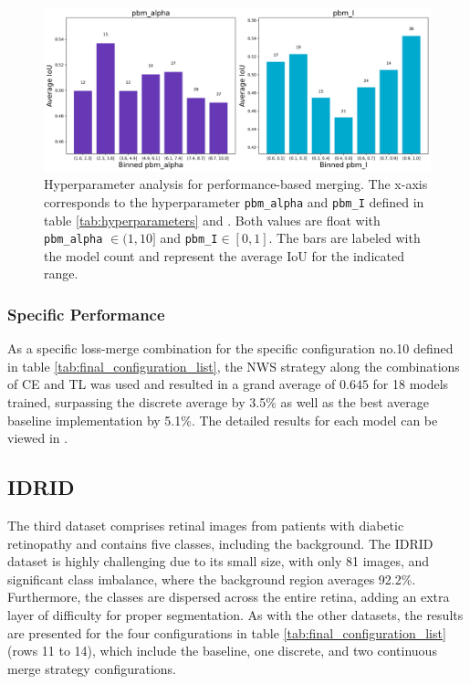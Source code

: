 \begin{figure}[H]%
  \centering
  \includegraphics[width=\imgWidthL]{images/continous_hyperparameter_total_melanoma.png}
  \caption[Hyperparameter analysis]{Hyperparameter analysis for performance-based merging. The x-axis corresponds to the hyperparameter \texttt{pbm\_alpha} and \texttt{pbm\_I} defined in table \ref{tab:hyperparameters} and . Both values are float with \texttt{pbm\_alpha} $\in (1,10]$ and \texttt{pbm\_I}$\in [0,1]$. The bars are labeled with the model count and represent the average \ac{IoU} for the indicated range.}
  \label{continous_results_total_melanoma}
\end{figure}

\subsubsection*{Specific Performance}
As a specific loss-merge combination for the specific configuration no.10 defined in table \ref{tab:final_configuration_list}, the NWS strategy along the combinations of \ac{CE} and \ac{TL} was used and resulted in a grand average of $0.645$ for 18 models trained, surpassing the discrete average by 3.5\% as well as the best average baseline implementation by 5.1\%. The detailed results for each model can be viewed in .

\subsection{IDRID}
\label{subsec:idrid}
The third dataset comprises retinal images from patients with diabetic retinopathy and contains five classes, including the background. The \ac{IDRID} dataset is highly challenging due to its small size, with only 81 images, and significant class imbalance, where the background region averages 92.2\%. Furthermore, the classes are dispersed across the entire retina, adding an extra layer of difficulty for proper segmentation. As with the other datasets, the results are presented for the four configurations in table \ref{tab:final_configuration_list} (rows 11 to 14), which include the baseline, one discrete, and two continuous merge strategy configurations.

